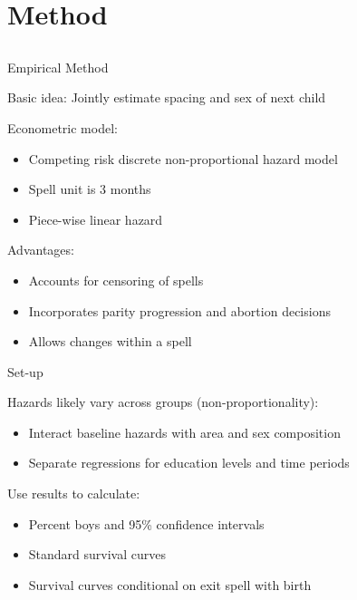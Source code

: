 \documentclass[red]{beamer}
\begin{document}
\subsection{}



\section{Method}
\subsection{}

\begin{frame}{Empirical Method}

\begin{block}{Basic idea:}
Jointly estimate spacing and sex of next child 
\end{block}

\bigskip
Econometric model:
\begin{itemize}
 \item Competing risk discrete non-proportional hazard model
 \item Spell unit is 3 months
 \item Piece-wise linear hazard
\end{itemize}

\bigskip
Advantages:
\begin{itemize}
 \item Accounts for censoring of spells
 \item Incorporates parity progression and abortion decisions
 \item Allows changes within a spell
\end{itemize}

\end{frame}

\begin{frame}{Set-up}

Hazards likely vary across groups (non-proportionality):
\begin{itemize}
 \item Interact baseline hazards with area and sex composition
 \item Separate regressions for education levels and time periods
\end{itemize}

\bigskip

Use results to calculate:
\begin{itemize}
\item Percent boys and 95\% confidence intervals
\item Standard survival curves
\item Survival curves conditional on exit spell with birth
\end{itemize}

\end{frame}
\end{document}

